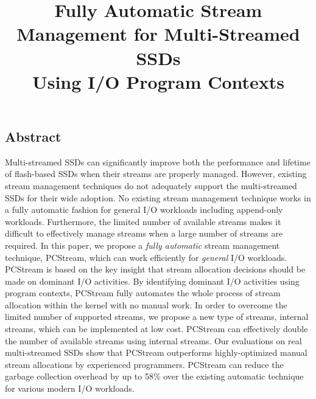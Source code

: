 \documentclass[letterpaper, twocolumn, 10pt]{article}
\begin{document}
\title{
\bf Fully Automatic Stream Management for Multi-Streamed SSDs \\ Using I/O Program Contexts}

%


\maketitle
\pagestyle{empty}
\subsection*{Abstract}
Multi-streamed SSDs
can significantly improve both the performance and lifetime of flash-based SSDs
when their streams are properly managed.  
However, existing stream management techniques do not adequately 
support the multi-streamed SSDs for their wide adoption.
No existing stream management technique works in a fully automatic fashion 
for general I/O workloads including append-only workloads.  
Furthermore, the limited number of available
streams makes it difficult to effectively manage streams 
when a large number of streams are required.
In this paper, we propose a {\it fully automatic} stream
management technique, \textsf{\small PCStream}, which can work efficiently for {\it general} I/O workloads.
\textsf{\small PCStream} is based on the key insight that stream allocation decisions should be made on 
dominant I/O activities. By identifying dominant I/O activities using program contexts, 
\textsf{\small PCStream} fully automates the whole process of stream allocation 
within the kernel with no manual work.
In order to overcome the limited number of supported streams, we propose a new 
type of streams, internal streams, which can be implemented at low cost.
\textsf{\small PCStream} can effectively double the number of available streams using internal streams.
Our evaluations on real multi-streamed SSDs show that \textsf{\small PCStream}
outperforms highly-optimized manual stream allocations by experienced 
programmers. \textsf{\small PCStream} can reduce the garbage collection overhead 
by up to 58\% over the existing automatic technique
for various modern I/O workloads.










\end{document}
